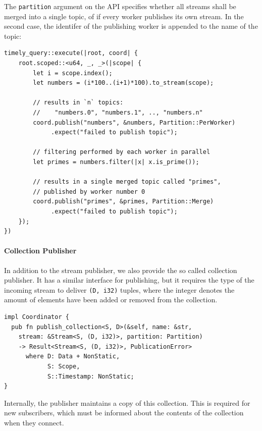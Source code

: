The \lstinline{partition} argument on the API specifies whether all streams
shall be merged into a single topic, of if every worker publishes its own stream.
In the second case, the identifer of the publishing worker is appended to the
name of the topic:

\begin{lstlisting}[caption={
Example use of publisher.
}]
timely_query::execute(|root, coord| {
    root.scoped::<u64, _, _>(|scope| {
        let i = scope.index();
        let numbers = (i*100..(i+1)*100).to_stream(scope);

        // results in `n` topics:
        //    "numbers.0", "numbers.1", .., "numbers.n"
        coord.publish("numbers", &numbers, Partition::PerWorker)
             .expect("failed to publish topic");

        // filtering performed by each worker in parallel
        let primes = numbers.filter(|x| x.is_prime());

        // results in a single merged topic called "primes",
        // published by worker number 0
        coord.publish("primes", &primes, Partition::Merge)
             .expect("failed to publish topic");
    });
})
\end{lstlisting}


\paragraph{Collection Publisher}

In addition to the stream publisher, we also provide the so called collection
publisher. It has a similar interface for publishing, but it requires the
type of the incoming stream to deliver \lstinline{(D, i32)} tuples, where
the integer denotes the amount of elements have been added or removed from
the collection.

\begin{lstlisting}[caption={[Collection publisher interface]
}]
impl Coordinator {
  pub fn publish_collection<S, D>(&self, name: &str,
    stream: &Stream<S, (D, i32)>, partition: Partition)
    -> Result<Stream<S, (D, i32)>, PublicationError>
      where D: Data + NonStatic, 
            S: Scope,
            S::Timestamp: NonStatic;
}
\end{lstlisting}

Internally, the publisher maintains a copy of this collection. This is required
for new subscribers, which must be informed about the contents of the collection
when they connect. 


